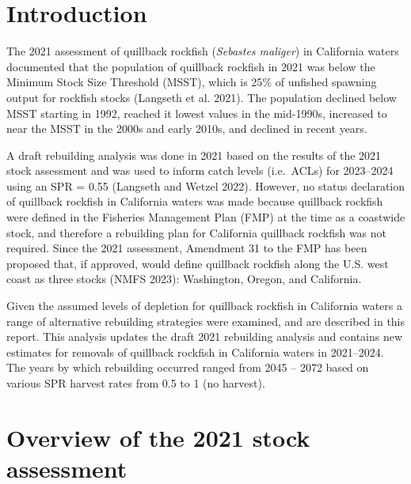 \documentclass[11pt,
  letterpaper,
]{article}
\begin{document}
\pagebreak
\setlength{\parskip}{3mm plus1mm minus1mm}
\setcounter{page}{1}
\renewcommand{\thefigure}{\arabic{figure}}
\renewcommand{\thetable}{\arabic{table}}
\setcounter{table}{0}
\setcounter{figure}{0}

\hypertarget{introduction}{%
\section{Introduction}\label{introduction}}

The 2021 assessment of quillback rockfish (\emph{Sebastes maliger}) in California waters documented that the population of quillback rockfish in 2021 was below the Minimum Stock Size Threshold (MSST), which is 25\(\%\) of unfished spawning output for rockfish stocks (Langseth et al. 2021). The population declined below MSST starting in 1992, reached it lowest values in the mid-1990s, increased to near the MSST in the 2000s and early 2010s, and declined in recent years.

A draft rebuilding analysis was done in 2021 based on the results of the 2021 stock assessment and was used to inform catch levels (i.e.~ACLs) for 2023--2024 using an SPR = 0.55 (Langseth and Wetzel 2022). However, no status declaration of quillback rockfish in California waters was made because quillback rockfish were defined in the Fisheries Management Plan (FMP) at the time as a coastwide stock, and therefore a rebuilding plan for California quillback rockfish was not required. Since the 2021 assessment, Amendment 31 to the FMP has been proposed that, if approved, would define quillback rockfish along the U.S. west coast as three stocks (NMFS 2023): Washington, Oregon, and California.

Given the assumed levels of depletion for quillback rockfish in California waters a range of alternative rebuilding strategies were examined, and are described in this report. This analysis updates the draft 2021 rebuilding analysis and contains new estimates for removals of quillback rockfish in California waters in 2021--2024. The years by which rebuilding occurred ranged from 2045 -- 2072 based on various SPR harvest rates from 0.5 to 1 (no harvest).

\hypertarget{overview-of-the-2021-stock-assessment}{%
\section{Overview of the 2021 stock assessment}\label{overview-of-the-2021-stock-assessment}}
\end{document}
